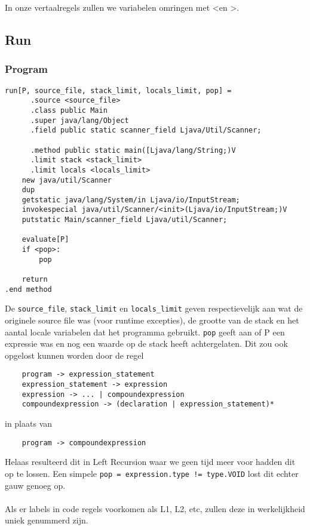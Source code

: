\documentclass[]{article}
\begin{document}
In onze vertaalregels zullen we variabelen omringen met \textless en \textgreater.

\subsection{Run}
\subsubsection{Program}
\begin{verbatim}
run[P, source_file, stack_limit, locals_limit, pop] = 
	  .source <source_file>
	  .class public Main
	  .super java/lang/Object
	  .field public static scanner_field Ljava/Util/Scanner;
	  
	  .method public static main([Ljava/lang/String;)V
	  .limit stack <stack_limit>
	  .limit locals <locals_limit>
    new java/util/Scanner
    dup
    getstatic java/lang/System/in Ljava/io/InputStream;
    invokespecial java/util/Scanner/<init>(Ljava/io/InputStream;)V
    putstatic Main/scanner_field Ljava/util/Scanner;

    evaluate[P]
    if <pop>:
        pop

    return
.end method
\end{verbatim}

De \texttt{source\_file}, \texttt{stack\_limit} en \texttt{locals\_limit} geven respectievelijk aan wat de originele source file was (voor runtime excepties), de grootte van de stack en het aantal locale variabelen dat het programma gebruikt. \texttt{pop} geeft aan of P een expressie was en nog een waarde op de stack heeft achtergelaten. Dit zou ook opgelost kunnen worden door de regel

\begin{verbatim}
    program -> expression_statement
    expression_statement -> expression
    expression -> ... | compoundexpression
    compoundexpression -> (declaration | expression_statement)* 
\end{verbatim}

in plaats van

\begin{verbatim}
    program -> compoundexpression
\end{verbatim}

Helaas resulteerd dit in Left Recursion waar we geen tijd meer voor hadden dit op te lossen. Een simpele \texttt{pop = expression.type != type.VOID} lost dit echter gauw genoeg op.\\
\\
Als er labels in code regels voorkomen als L1, L2, etc, zullen deze in werkelijkheid uniek genummerd zijn.
\end{document}

